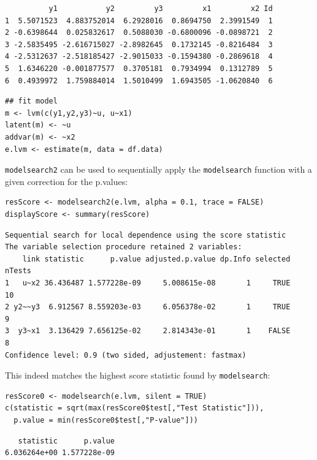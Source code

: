 \documentclass[12pt]{article}
\begin{document}
\begin{verbatim}
          y1           y2         y3         x1         x2 Id
1  5.5071523  4.883752014  6.2928016  0.8694750  2.3991549  1
2 -0.6398644  0.025832617  0.5088030 -0.6800096 -0.0898721  2
3 -2.5835495 -2.616715027 -2.8982645  0.1732145 -0.8216484  3
4 -2.5312637 -2.518185427 -2.9015033 -0.1594380 -0.2869618  4
5  1.6346220 -0.001877577  0.3705181  0.7934994  0.1312789  5
6  0.4939972  1.759884014  1.5010499  1.6943505 -1.0620840  6
\end{verbatim}


\lstset{language=r,label= ,caption= ,captionpos=b,numbers=none}
\begin{lstlisting}
## fit model
m <- lvm(c(y1,y2,y3)~u, u~x1)
latent(m) <- ~u
addvar(m) <- ~x2 
e.lvm <- estimate(m, data = df.data)
\end{lstlisting}

\texttt{modelsearch2} can be used to sequentially apply the \texttt{modelsearch}
function with a given correction for the p.values:
\lstset{language=r,label= ,caption= ,captionpos=b,numbers=none}
\begin{lstlisting}
resScore <- modelsearch2(e.lvm, alpha = 0.1, trace = FALSE)
displayScore <- summary(resScore)
\end{lstlisting}

\begin{verbatim}
Sequential search for local dependence using the score statistic 
The variable selection procedure retained 2 variables:
    link statistic      p.value adjusted.p.value dp.Info selected nTests
1   u~x2 36.436487 1.577228e-09     5.008615e-08       1     TRUE     10
2 y2~~y3  6.912567 8.559203e-03     6.056378e-02       1     TRUE      9
3  y3~x1  3.136429 7.656125e-02     2.814343e-01       1    FALSE      8
Confidence level: 0.9 (two sided, adjustement: fastmax)
\end{verbatim}


This indeed matches the highest score statistic found by
\texttt{modelsearch}:
\lstset{language=r,label= ,caption= ,captionpos=b,numbers=none}
\begin{lstlisting}
resScore0 <- modelsearch(e.lvm, silent = TRUE)
c(statistic = sqrt(max(resScore0$test[,"Test Statistic"])), 
  p.value = min(resScore0$test[,"P-value"]))
\end{lstlisting}

\begin{verbatim}
   statistic      p.value 
6.036264e+00 1.577228e-09
\end{verbatim}
\end{document}
